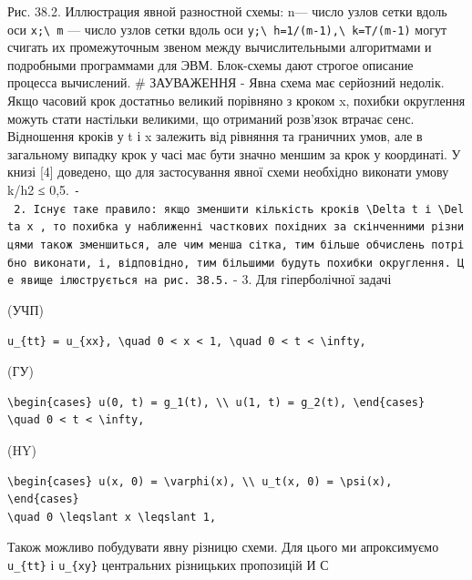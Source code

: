\documentclass[
  ukrainian,
]{article}
\begin{document}
Рис. 38.2. Иллюстрация явной разностной схемы: n--- число узлов сетки
вдоль оси \texttt{x;\textbackslash{}\ m} --- число узлов сетки вдоль оси
\texttt{y;\textbackslash{}\ h=1/(m-1),\textbackslash{}\ k=T/(m-1)} могут
счигать их промежуточным звеном между вычислительными алгоритмами и
подробными программами для ЭВМ. Блок-схемы дают строгое описание
процесса вычислений. \# ЗАУВАЖЕННЯ - Явна схема має серйозний недолік.
Якщо часовий крок достатньо великий порівняно з кроком x, похибки
округлення можуть стати настільки великими, що отриманий розв'язок
втрачає сенс. Відношення кроків у t і x залежить від рівняння та
граничних умов, але в загальному випадку крок у часі має бути значно
меншим за крок у координаті. У книзі {[}4{]} доведено, що для
застосування явної схеми необхідно виконати умову k/h2 ≤ 0,5.
\texttt{-\ 2.\ Існує\ таке\ правило:\ якщо\ зменшити\ кількість\ кроків\ \textquotesingle{}\textbackslash{}Delta\ t\textquotesingle{}\ і\ \textquotesingle{}\textbackslash{}Delta\ x\textquotesingle{}\ ,\ то\ похибка\ у\ наближенні\ часткових\ похідних\ за\ скінченними\ різницями\ також\ зменшиться,\ але\ чим\ менша\ сітка,\ тим\ більше\ обчислень\ потрібно\ виконати,\ і,\ відповідно,\ тим\ більшими\ будуть\ похибки\ округлення.\ Це\ явище\ ілюструється\ на\ рис.\ 38.5.}
- 3. Для гіперболічної задачі

(УЧП)

\begin{verbatim}
u_{tt} = u_{xx}, \quad 0 < x < 1, \quad 0 < t < \infty,
\end{verbatim}

(ГУ)

\begin{verbatim}
\begin{cases} u(0, t) = g_1(t), \\ u(1, t) = g_2(t), \end{cases}
\quad 0 < t < \infty,
\end{verbatim}

(HY)

\begin{verbatim}
\begin{cases} u(x, 0) = \varphi(x), \\ u_t(x, 0) = \psi(x), \end{cases}
\quad 0 \leqslant x \leqslant 1,
\end{verbatim}

Також можливо побудувати явну різницю схеми. Для цього ми апроксимуємо
\texttt{u\_\{tt\}} і \texttt{u\_\{xy\}} центральних різницьких
пропозицій И С
\end{document}
